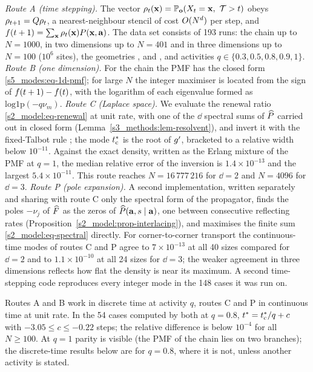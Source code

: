 \emph{Route A (time stepping).} The vector $\rho_t(\vx)=\Prob_{\vo}(X_t=\vx,\ \FPT>t)$ obeys $\rho_{t+1}=Q\rho_t$, a
nearest-neighbour stencil of cost $O(N^{d})$ per step, and $f(t+1)=\sum_{\mathbf{x}}\rho_t(\mathbf{x})P(\mathbf{x},\mathbf{a})$. The data
set consists of 193 runs: the chain up to $N=1000$, \CC{} in two dimensions up to $N=401$ and in three dimensions up to
$N=100$ ($10^{6}$ sites), the geometries \CtM, \MtC{} and \EXIT, and activities $q\in\{0.3,0.5,0.8,0.9,1\}$.
\emph{Route B (one dimension).} For the chain the PMF has the closed form \eqref{s5_modes:eq-1d-pmf}; for large $N$
the integer maximiser is located from the sign of $f(t+1)-f(t)$, with the logarithm of each eigenvalue
formed as $\mathrm{log1p}(-q\nu_m)$.
\emph{Route C (Laplace space).} We evaluate the renewal ratio \eqref{s2_model:eq-renewal} at unit rate, with one of
the $\dd$ spectral sums of $\widehat{P}$ carried out in closed form (Lemma~\ref{s3_methods:lem-resolvent}), and invert it
with the fixed-Talbot rule \citep{Talbot1979,AbateValko2004,Weideman2006}; the mode $t^{*}_{\mathrm{c}}$ is the root of $g'$,
bracketed to a relative width below $10^{-11}$. Against the exact density, written as the Erlang mixture of the PMF at
$q=1$, the median relative error of the inversion is $1.4\times10^{-13}$ and the largest $5.4\times10^{-11}$. This
route reaches $N=16\,777\,216$ for $\dd=2$ and $N=4096$ for $\dd=3$.
\emph{Route P (pole expansion).} A second implementation, written separately and sharing with route C only the
spectral form of the propagator, finds the poles $-\nu_j$ of $\widehat{F}$ as the zeros of $\widehat{P}(\mathbf{a},s\mid\mathbf{a})$, one between
consecutive reflecting rates (Proposition~\ref{s2_model:prop-interlacing}), and maximises the finite sum
\eqref{s2_model:eq-spectral} directly. For corner-to-corner transport the continuous-time modes of routes C and P agree
to $7\times10^{-13}$ at all 40 sizes compared for $\dd=2$ and to $1.1\times10^{-10}$ at all 24 sizes for $\dd=3$; the
weaker agreement in three dimensions reflects how flat the density is near its maximum. A second time-stepping code
reproduces every integer mode in the 148 cases it was run on.

Routes A and B work in discrete time at activity $q$, routes C and P in continuous time at unit rate. In the 54
cases computed by both at $q=0.8$, $t^{*}=t^{*}_{\mathrm{c}}/q+c$ with $-3.05\le c\le-0.22$ steps; the relative difference is
below $10^{-4}$ for all $N\ge100$. At $q=1$ parity is visible (the PMF of the chain lies on two branches); the
discrete-time results below are for $q=0.8$, where it is not, unless another activity is stated.


